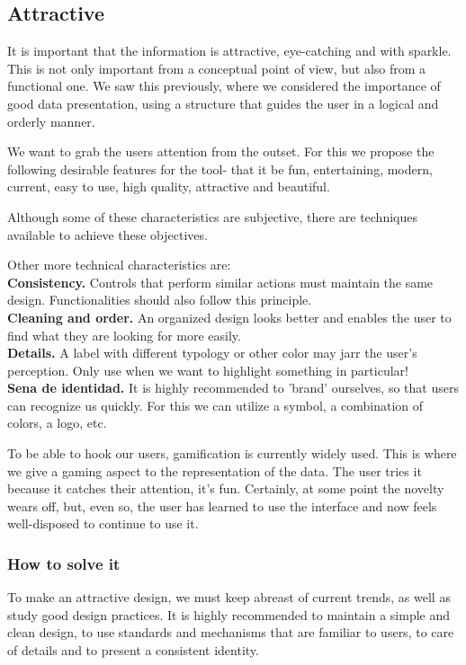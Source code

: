 \subsection{Attractive}
It is important that the information is attractive, eye-catching and with sparkle. This is not only important from a conceptual point of view, but also from a functional one. We saw this previously, where we considered the importance
of good data presentation, using a structure that guides the user in a logical and orderly manner.

We want to grab the users attention from the outset. For this we propose the following desirable features for the tool- that it be fun, entertaining,
modern, current, easy to use, high quality, attractive and beautiful.

Although some of these characteristics are subjective, there are techniques available to achieve these objectives.

Other more technical characteristics are: \\

\textbf{Consistency.} Controls that perform similar actions must maintain the same design. Functionalities
should also follow this principle. \\

\textbf{Cleaning and order.} An organized design looks better and enables the user to find what they are looking for
more easily.\\

\textbf{Details.} A label with different typology or other color may jarr the user's perception. Only use when
we want to highlight something in particular! \\

\textbf{Sena de identidad.} It is highly recommended to 'brand' ourselves, so that users can recognize us quickly. For this we can utilize a symbol, a combination of colors, a logo, etc.

To be able to hook our users, gamification is currently widely used. This is where we give a gaming aspect to the representation of the data. The user tries it because it catches their attention, it's fun.
Certainly, at some point the novelty wears off, but, even so, the user has learned to use the interface and now feels well-disposed to continue to use it.

\subsubsection{How to solve it} 
To make an attractive design, we must keep abreast of current trends, as well as study good design practices.
It is highly recommended to maintain a simple and clean design, to use standards and mechanisms that are familiar to users,
to care of details and to present a consistent identity.
